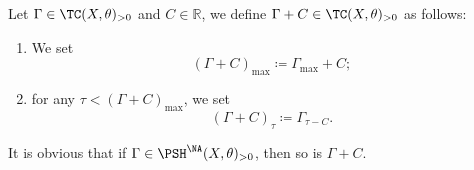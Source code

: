 \begin{definition}\label{def:testcurvplusC}
    Let $\Gamma\in \TC(X,\theta)_{>0}$ and $C\in \mathbb{R}$, we define $\Gamma+C\in \TC(X,\theta)_{>0}$ as follows:
    \begin{enumerate}
        \item\label{itm:def:testcurvplusC:1} We set
        \[
            (\Gamma+C)_{\max}\coloneqq \Gamma_{\max}+C;
        \]
        \item\label{itm:def:testcurvplusC:2} for any $\tau<(\Gamma+C)_{\max}$, we set
        \[
        (\Gamma+C)_{\tau}\coloneqq \Gamma_{\tau-C}.
        \]
    \end{enumerate}
\end{definition}
It is obvious that if $\Gamma\in \PSH^{\NA}(X,\theta)_{>0}$, then so is $\Gamma+C$.

